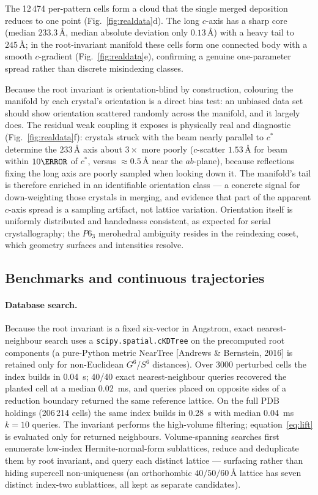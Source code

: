 \documentclass[11pt]{article}
\newcommand{\Ang}{\text{\AA}}
\begin{document}
The 12\,474 per-pattern cells form a cloud that the single merged deposition
reduces to one point (Fig.~\ref{fig:realdata}d). The long $c$-axis has a sharp
core (median $233.3\,\Ang$, median absolute deviation only $0.13\,\Ang$) with a
heavy tail to $245\,\Ang$; in the root-invariant manifold these cells form one
connected body with a smooth $c$-gradient (Fig.~\ref{fig:realdata}e), confirming
a genuine one-parameter spread rather than discrete misindexing classes.

Because the root invariant is orientation-blind by construction, colouring the
manifold by each crystal's orientation is a direct bias test: an unbiased data
set should show orientation scattered randomly across the manifold, and it
largely does. The residual weak coupling it exposes is physically real and
diagnostic (Fig.~\ref{fig:realdata}f): crystals struck with the beam nearly
parallel to $c^*$ determine the $233\,\Ang$ axis about $3\times$ more poorly
($c$-scatter $1.53\,\Ang$ for beam within $10\degree$ of $c^*$, versus
$\approx 0.5\,\Ang$ near the $ab$-plane), because reflections fixing the long
axis are poorly sampled when looking down it. The manifold's tail is therefore
enriched in an identifiable orientation class --- a concrete signal for
down-weighting those crystals in merging, and evidence that part of the apparent
$c$-axis spread is a sampling artifact, not lattice variation. Orientation itself
is uniformly distributed and handedness consistent, as expected for serial
crystallography; the $P6_3$ merohedral ambiguity resides in the reindexing coset,
which geometry surfaces and intensities resolve.

\subsection{Benchmarks and continuous trajectories}
\label{sec:benchmarks}

\paragraph{Database search.}
Because the root invariant is a fixed six-vector in Angstrom, exact
nearest-neighbour search uses a \texttt{scipy.spatial.cKDTree} on the
precomputed root components (a pure-Python metric NearTree [Andrews \& Bernstein,
2016] is retained only for non-Euclidean $G^6$/$S^6$ distances). Over 3000
perturbed cells the index builds in \SI{0.04}{\second}; 40/40 exact
nearest-neighbour queries recovered the planted cell at a median
\SI{0.02}{\milli\second}, and queries placed on opposite sides of a reduction
boundary returned the same reference lattice. On the full PDB holdings
(206\,214 cells) the same index builds in \SI{0.28}{\second} with median
\SI{0.04}{\milli\second} $k{=}10$ queries. The invariant performs the
high-volume filtering; equation~\eqref{eq:lift} is evaluated only for returned
neighbours. Volume-spanning searches first enumerate low-index
Hermite-normal-form sublattices, reduce and deduplicate them by root invariant,
and query each distinct lattice --- surfacing rather than hiding supercell
non-uniqueness (an orthorhombic $40/50/60\,\Ang$ lattice has seven distinct
index-two sublattices, all kept as separate candidates).
\end{document}
